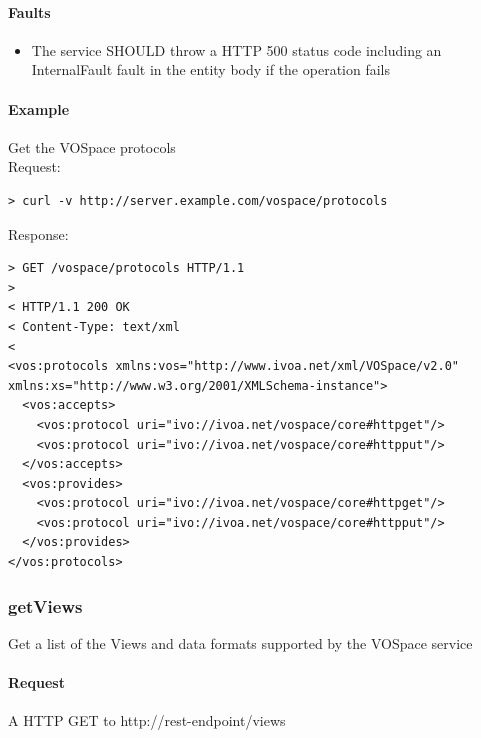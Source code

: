 \documentclass[11pt,a4paper]{ivoa}
\begin{document}
\paragraph{Faults}
\begin{itemize}
    \item The service SHOULD throw a HTTP 500 status code including an InternalFault fault in the entity body if the operation fails
\end{itemize}

\paragraph{Example}
Get the VOSpace protocols
\\[5px]
\noindent
Request:
\begin{lstlisting}
> curl -v http://server.example.com/vospace/protocols
\end{lstlisting}
Response:
\begin{lstlisting}
> GET /vospace/protocols HTTP/1.1
>
< HTTP/1.1 200 OK
< Content-Type: text/xml
<
<vos:protocols xmlns:vos="http://www.ivoa.net/xml/VOSpace/v2.0" xmlns:xs="http://www.w3.org/2001/XMLSchema-instance">
  <vos:accepts>
    <vos:protocol uri="ivo://ivoa.net/vospace/core#httpget"/>
    <vos:protocol uri="ivo://ivoa.net/vospace/core#httpput"/>
  </vos:accepts>
  <vos:provides>
    <vos:protocol uri="ivo://ivoa.net/vospace/core#httpget"/>
    <vos:protocol uri="ivo://ivoa.net/vospace/core#httpput"/>
  </vos:provides>
</vos:protocols>
\end{lstlisting}

\subsubsection{getViews}
\label{subsubsec:getviews}
Get a list of the Views and data formats supported by the VOSpace service

\paragraph{Request}
A HTTP GET to http://rest-endpoint/views
\end{document}
